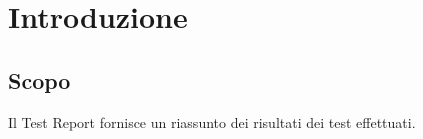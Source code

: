 \chapter{Introduzione}

\section{Scopo}
Il Test Report fornisce un riassunto dei risultati dei test effettuati.